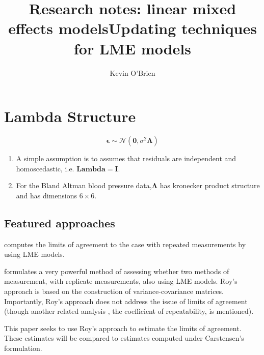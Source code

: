 \documentclass[12pt, a4paper]{article}
\title{Research notes: linear mixed effects models}
\author{ } \date{ }
\theoremstyle{plain}
\theoremstyle{definition}
\theoremstyle{remark}
\begin{document}
\author{Kevin O'Brien}
\title{Updating techniques for LME models}


\newpage
\newpage
\section{Lambda Structure}

\begin{equation}
\boldsymbol{\epsilon} \sim \mathcal{N}(\boldsymbol{0},\sigma^2 \boldsymbol{\Lambda})
\end{equation}
\begin{enumerate}
\item A simple assumption is to assumes that residuals are independent and homoscedastic, i.e. $\boldsymbol{Lambda = I}$.

\item For the Bland Altman blood pressure data,$\boldsymbol{\Lambda}$ has kronecker product structure
and has dimensions $6 \times 6$.
\end{enumerate}











\subsection{Featured approaches}

\citet{bxc2008} computes the limits of agreement to the case with repeated measurements by using LME models.

\citet{Roy} formulates a very powerful method of assessing whether two methods of measurement, with replicate measurements, also using LME models. Roy's approach is based on the construction of variance-covariance matrices.
Importantly, Roy's approach does not address the issue of limits of agreement (though another related analysis , the coefficient of repeatability, is mentioned).

This paper seeks to use Roy's approach to estimate the limits of agreement. These estimates will be compared to estimates computed under Carstensen's formulation.
\end{document}
